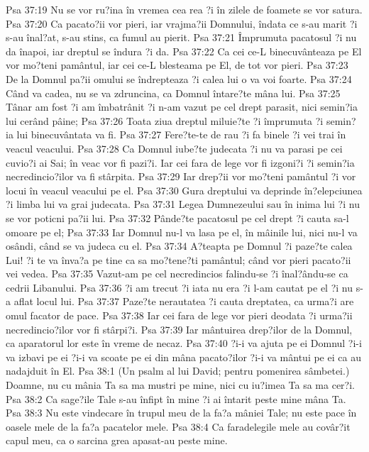 Psa 37:19  Nu se vor ru?ina în vremea cea rea ?i în zilele de foamete se vor satura.
Psa 37:20  Ca pacato?ii vor pieri, iar vrajma?ii Domnului, îndata ce s-au marit ?i s-au înal?at, s-au stins, ca fumul au pierit.
Psa 37:21  Împrumuta pacatosul ?i nu da înapoi, iar dreptul se îndura ?i da.
Psa 37:22  Ca cei ce-L binecuvânteaza pe El vor mo?teni pamântul, iar cei ce-L blesteama pe El, de tot vor pieri.
Psa 37:23  De la Domnul pa?ii omului se îndrepteaza ?i calea lui o va voi foarte.
Psa 37:24  Când va cadea, nu se va zdruncina, ca Domnul întare?te mâna lui.
Psa 37:25  Tânar am fost ?i am îmbatrânit ?i n-am vazut pe cel drept parasit, nici semin?ia lui cerând pâine;
Psa 37:26  Toata ziua dreptul miluie?te ?i împrumuta ?i semin?ia lui binecuvântata va fi.
Psa 37:27  Fere?te-te de rau ?i fa binele ?i vei trai în veacul veacului.
Psa 37:28  Ca Domnul iube?te judecata ?i nu va parasi pe cei cuvio?i ai Sai; în veac vor fi pazi?i. Iar cei fara de lege vor fi izgoni?i ?i semin?ia necredincio?ilor va fi stârpita.
Psa 37:29  Iar drep?ii vor mo?teni pamântul ?i vor locui în veacul veacului pe el.
Psa 37:30  Gura dreptului va deprinde în?elepciunea ?i limba lui va grai judecata.
Psa 37:31  Legea Dumnezeului sau în inima lui ?i nu se vor poticni pa?ii lui.
Psa 37:32  Pânde?te pacatosul pe cel drept ?i cauta sa-l omoare pe el;
Psa 37:33  Iar Domnul nu-l va lasa pe el, în mâinile lui, nici nu-l va osândi, când se va judeca cu el.
Psa 37:34  A?teapta pe Domnul ?i paze?te calea Lui! ?i te va înva?a pe tine ca sa mo?tene?ti pamântul; când vor pieri pacato?ii vei vedea.
Psa 37:35  Vazut-am pe cel necredincios falindu-se ?i înal?ându-se ca cedrii Libanului.
Psa 37:36  ?i am trecut ?i iata nu era ?i l-am cautat pe el ?i nu s-a aflat locul lui.
Psa 37:37  Paze?te nerautatea ?i cauta dreptatea, ca urma?i are omul facator de pace.
Psa 37:38  Iar cei fara de lege vor pieri deodata ?i urma?ii necredincio?ilor vor fi stârpi?i.
Psa 37:39  Iar mântuirea drep?ilor de la Domnul, ca aparatorul lor este în vreme de necaz.
Psa 37:40  ?i-i va ajuta pe ei Domnul ?i-i va izbavi pe ei ?i-i va scoate pe ei din mâna pacato?ilor ?i-i va mântui pe ei ca au nadajduit în El.
Psa 38:1  (Un psalm al lui David; pentru pomenirea sâmbetei.) Doamne, nu cu mânia Ta sa ma mustri pe mine, nici cu iu?imea Ta sa ma cer?i.
Psa 38:2  Ca sage?ile Tale s-au înfipt în mine ?i ai întarit peste mine mâna Ta.
Psa 38:3  Nu este vindecare în trupul meu de la fa?a mâniei Tale; nu este pace în oasele mele de la fa?a pacatelor mele.
Psa 38:4  Ca faradelegile mele au covâr?it capul meu, ca o sarcina grea apasat-au peste mine.
